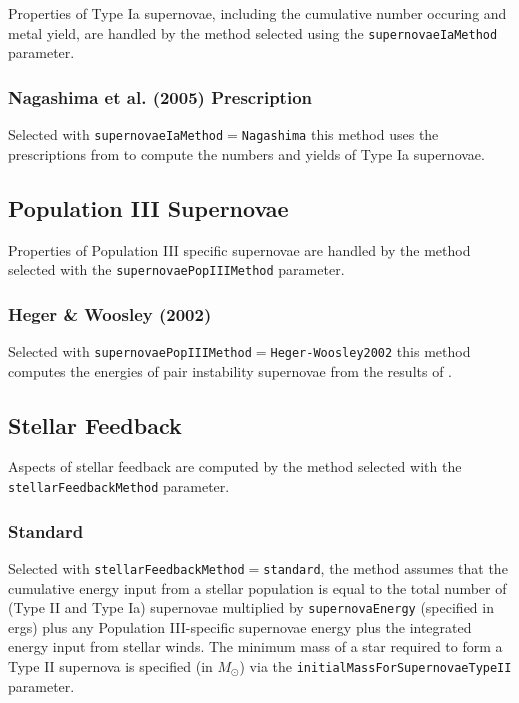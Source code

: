 Properties of Type Ia supernovae, including the cumulative number occuring and metal yield, are handled by the method selected using the {\tt supernovaeIaMethod} parameter.

\subsubsection{Nagashima et al. (2005) Prescription}

Selected with {\tt supernovaeIaMethod}$=${\tt Nagashima} this method uses the prescriptions from \cite{nagashima_metal_2005} to compute the numbers and yields of Type Ia supernovae.

\subsection{Population III Supernovae}

Properties of Population III specific supernovae are handled by the method selected with the {\tt supernovaePopIIIMethod} parameter.

\subsubsection{Heger \& Woosley (2002)}

Selected with {\tt supernovaePopIIIMethod}$=${\tt Heger-Woosley2002} this method computes the energies of pair instability supernovae from the results of \cite{heger_nucleosynthetic_2002}.

\subsection{Stellar Feedback}

Aspects of stellar feedback are computed by the method selected with the {\tt stellarFeedbackMethod} parameter.

\subsubsection{Standard}

Selected with {\tt stellarFeedbackMethod}$=${\tt standard}, the method assumes that the cumulative energy input from a stellar population is equal to the total number of (Type II and Type Ia) supernovae multiplied by {\tt supernovaEnergy} (specified in ergs) plus any Population III-specific supernovae energy plus the integrated energy input from stellar winds. The minimum mass of a star required to form a Type II supernova is specified (in $M_\odot$) via the {\tt initialMassForSupernovaeTypeII} parameter.

